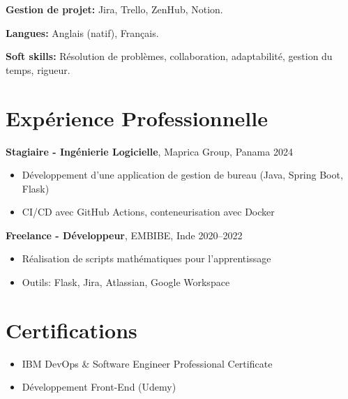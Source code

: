 \documentclass[10pt, letterpaper]{article}
\begin{document}
\vspace{2.1mm}
\textbf{Gestion de projet:} Jira, Trello, ZenHub, Notion.

\vspace{2.1mm}
\textbf{Langues:} Anglais (natif), Fran\c{c}ais.

\vspace{2.1mm}
\textbf{Soft skills:} R\'esolution de probl\`emes, collaboration, adaptabilit\'e, gestion du temps, rigueur.

\section*{Exp\'erience Professionnelle}
\textbf{Stagiaire - Ing\'enierie Logicielle}, Maprica Group, Panama \hfill 2024
\begin{itemize}[leftmargin=*, topsep=2pt, itemsep=1pt]
\item D\'eveloppement d'une application de gestion de bureau (Java, Spring Boot, Flask)
\item CI/CD avec GitHub Actions, conteneurisation avec Docker
\end{itemize}

\textbf{Freelance - D\'eveloppeur}, EMBIBE, Inde \hfill 2020--2022
\begin{itemize}[leftmargin=*, topsep=2pt, itemsep=1pt]
\item R\'ealisation de scripts math\'ematiques pour l'apprentissage
\item Outils: Flask, Jira, Atlassian, Google Workspace
\end{itemize}

\section*{Certifications}
\begin{itemize}[leftmargin=*, topsep=2pt, itemsep=1pt]
\item IBM DevOps \& Software Engineer Professional Certificate
\item D\'eveloppement Front-End (Udemy)
\end{itemize}

\end{document}
